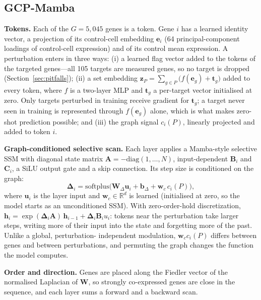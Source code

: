 \subsection{GCP-Mamba}
\textbf{Tokens.} Each of the $G=5{,}045$ genes is a token. Gene $i$ has a learned
identity vector, a projection of its control-cell embedding $\mathbf{e}_i$ (64
principal-component loadings of control-cell expression) and of its control mean
expression. A perturbation enters in three ways: (i) a learned flag vector added
to the tokens of the targeted genes---all 105 targets are measured genes, so no
target is dropped (Section~\ref{sec:pitfalls}); (ii) a set embedding
$\mathbf{z}_P=\sum_{g\in P}\big(f(\mathbf{e}_g)+\mathbf{t}_g\big)$ added to every
token, where $f$ is a two-layer MLP and $\mathbf{t}_g$ a per-target vector
initialised at zero. Only targets perturbed in training receive gradient for
$\mathbf{t}_g$; a target never seen in training is represented through
$f(\mathbf{e}_g)$ alone, which is what makes zero-shot prediction possible; and (iii)
the graph signal $c_i(P)$, linearly projected and added to token $i$.

\textbf{Graph-conditioned selective scan.} Each layer applies a Mamba-style
selective SSM \citep{gu2023} with diagonal state matrix
$\mathbf{A}=-\mathrm{diag}(1,\dots,N)$, input-dependent $\mathbf{B}_i$ and
$\mathbf{C}_i$, a SiLU output gate and a skip connection. Its step size is
conditioned on the graph:
\begin{equation}
\boldsymbol{\Delta}_i=\mathrm{softplus}\big(\mathbf{W}_{\Delta}\mathbf{u}_i+\mathbf{b}_{\Delta}+\mathbf{w}_c\,c_i(P)\big),
\end{equation}
where $\mathbf{u}_i$ is the layer input and $\mathbf{w}_c\in\mathbb{R}^{d}$ is
learned (initialised at zero, so the model starts as an unconditioned SSM). With
zero-order-hold discretization,
$\mathbf{h}_i=\exp(\boldsymbol{\Delta}_i\mathbf{A})\,\mathbf{h}_{i-1}+\boldsymbol{\Delta}_i\mathbf{B}_i u_i$:
tokens near the perturbation take larger steps, writing more of their input into
the state and forgetting more of the past. Unlike a global, perturbation-
independent modulation, $\mathbf{w}_c c_i(P)$ differs between genes and between
perturbations, and permuting the graph changes the function the model computes.

\textbf{Order and direction.} Genes are placed along the Fiedler vector
\citep{fiedler1973} of the normalised Laplacian of $\mathbf{W}$, so strongly
co-expressed genes are close in the sequence, and each layer sums a forward and a
backward scan.

